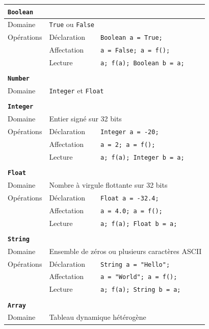 \documentclass[french]{article}
\begin{document}
				\begin{longtable}{lll}
					\textbf{\texttt{Boolean}}\\ \hline \hline
					Domaine & \multicolumn{2}{l}{\texttt{True} ou \texttt{False}}\\ 
					Opérations & Déclaration & \texttt{Boolean a = True;}\\
					& Affectation & \texttt{a = False; a = f();}\\
					& Lecture & \texttt{a; f(a); Boolean b = a;}\\ 
					\\
					\textbf{\texttt{Number}}\\ \hline \hline
					Domaine & \multicolumn{2}{l}{\texttt{Integer} et \texttt{Float}}\\ 
					\\
					\textbf{\texttt{Integer}}\\ \hline \hline
					Domaine & \multicolumn{2}{l}{Entier signé sur 32 bits}\\
					Opérations & Déclaration & \texttt{Integer a = -20;}\\
					& Affectation & \texttt{a = 2; a = f();}\\
					& Lecture & \texttt{a; f(a); Integer b = a;}\\ 
					\\
					\textbf{\texttt{Float}}\\ \hline \hline
					Domaine & \multicolumn{2}{l}{Nombre à virgule flottante sur 32 bits}\\
					Opérations & Déclaration & \texttt{Float a = -32.4;}\\
					& Affectation & \texttt{a = 4.0; a = f();}\\
					& Lecture & \texttt{a; f(a); Float b = a;}\\ 
					\\
					\textbf{\texttt{String}}\\ \hline \hline
					Domaine & \multicolumn{2}{l}{Ensemble de zéros ou plusieurs caractères ASCII}\\
					Opérations & Déclaration & \texttt{String a = "Hello";}\\
					& Affectation & \texttt{a = "World"; a = f();}\\
					& Lecture & \texttt{a; f(a); String b = a;}\\ 
					\\
					\textbf{\texttt{Array}}\\ \hline \hline
					Domaine & \multicolumn{2}{l}{Tableau dynamique hétérogène}\\

\end{longtable}
\end{document}
